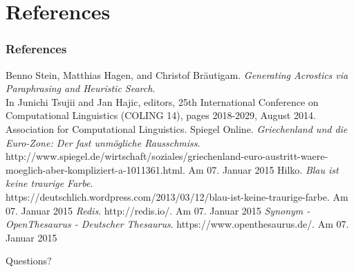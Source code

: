 \documentclass{beamer}
\begin{document}



\section{References}

\begin{frame}
\frametitle{References}
\scriptsize
\begin{thebibliography}{1}
	Benno Stein, Matthias Hagen, and Christof Bräutigam. \emph{Generating Acrostics via Paraphrasing and Heuristic Search}. \\
	In Junichi Tsujii and Jan Hajic, editors, 25th International Conference on Computational Linguistics (COLING 14), pages 2018-2029, August 2014. Association for Computational Linguistics.
	Spiegel Online. \emph{Griechenland und die Euro-Zone: Der fast unmögliche Rausschmiss}. \\
	http://www.spiegel.de/wirtschaft/soziales/griechenland-euro-austritt-waere-moeglich-aber-kompliziert-a-1011361.html. Am 07. Januar 2015
	Hilko. \emph{Blau ist keine traurige Farbe}. \\
	https://deutschlich.wordpress.com/2013/03/12/blau-ist-keine-traurige-farbe. Am 07. Januar 2015
	\emph{Redis}. http://redis.io/. Am 07. Januar 2015
	\emph{Synonym - OpenThesaurus - Deutscher Thesaurus}. https://www.openthesaurus.de/. Am 07. Januar 2015
\end{thebibliography}
\end{frame}

\begin{frame}
\Huge{\centerline{Questions?}}
\end{frame}

\end{document}
